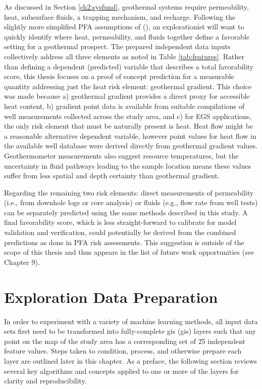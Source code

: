 As discussed in Section \ref{ch2:sysfund}, geothermal systems require permeability, heat, subsurface fluids, a trapping mechanism, and recharge. Following the slightly more simplified PFA assumptions of \citeauthor{bielicki_hydrogeolgic_2015} (\citeyear{bielicki_hydrogeolgic_2015}), an explorationist will want to quickly identify where heat, permeability, and fluids together define a favorable setting for a geothermal prospect. The prepared independent data inputs collectively address all three elements as noted in Table \ref{tab:features}. Rather than defining a dependent (predicted) variable that describes a total favorability score, this thesis focuses on a proof of concept prediction for a measurable quantity addressing just the heat risk element: geothermal gradient. This choice was made because a) geothermal gradient provides a direct proxy for accessible heat content, b) gradient point data is available from suitable compilations of well measurements collected across the study area, and c) for EGS applications, the only risk element that must be naturally present is heat. Heat flow might be a reasonable alternative dependent variable, however point values for heat flow in the available well database were derived directly from geothermal gradient values. Geothermometer measurements also suggest resource temperatures, but the uncertainty in fluid pathways leading to the sample location means these values suffer from less spatial and depth certainty than geothermal gradient.

Regarding the remaining two risk elements: direct measurements of permeability (i.e., from downhole logs or core analysis) or fluids (e.g., flow rate from well tests) can be separately predicted using the same methods described in this study. A final favorability score, which is less straight-forward to calibrate for model validation and verification, could potentially be derived from the combined predictions as done in PFA risk assessments. This suggestion is outside of the scope of this thesis and thus appears in the list of future work opportunities (see Chapter 9).

\section{Exploration Data Preparation}

In order to experiment with a variety of machine learning methods, all input data sets first need to be transformed into fully-complete \acrlong{gis} (\acrshort{gis}) layers such that any point on the map of the study area has a corresponding set of 25 independent feature values. Steps taken to condition, process, and otherwise prepare each layer are outlined later in this chapter. As a preface, the following section reviews several key algorithms and concepts applied to one or more of the layers for clarity and reproducibility.

